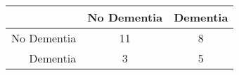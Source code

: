 \begin{table}[ht]
\centering
\begin{tabular}{r|c|c}
  \hline
 & No Dementia & Dementia \\ 
  \hline
No Dementia & 11 & 8 \\ 
  Dementia & 3 & 5 \\ 
   \hline
\end{tabular}
\end{table}
